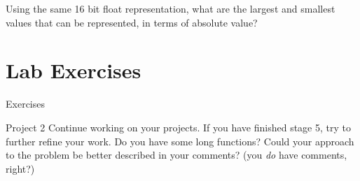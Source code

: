 \documentclass{beamer}
\begin{document}
\begin{frame}{13.3}
    Using the same 16 bit float representation, what are the largest and
    smallest values that can be represented, in terms of absolute value?
\end{frame}


\section{Lab Exercises}

\begin{frame}{Exercises}
    \begin{block}{Project 2}
        Continue working on your projects. If you have finished stage 5,
        try to further refine your work. Do you have some long functions?
        Could your approach to the problem be better described in your
        comments? (you \emph{do} have comments, right?)
    \end{block}
\end{frame}

%
%
\end{document}
